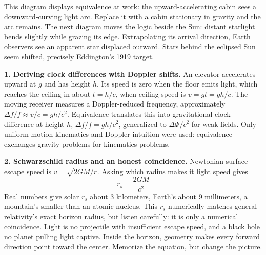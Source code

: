 \begin{mainline}
This diagram displays equivalence at work: the upward-accelerating cabin sees a downward-curving light arc. Replace it with a cabin stationary in gravity and the arc remains. The next diagram moves the logic beside the Sun: distant starlight bends slightly while grazing its edge. Extrapolating its arrival direction, Earth observers see an apparent star displaced outward. Stars behind the eclipsed Sun seem shifted, precisely Eddington's 1919 target.
\end{mainline}

\begin{center}
\end{center}

\begin{mathbridge}
\textbf{1. Deriving clock differences with Doppler shifts.} An elevator accelerates upward at \(g\) and has height \(h\). Its speed is zero when the floor emits light, which reaches the ceiling in about \(t=h/c\), when ceiling speed is \(v=gt=gh/c\). The moving receiver measures a Doppler-reduced frequency, approximately \(\Delta f/f\approx v/c=gh/c^{2}\). Equivalence translates this into gravitational clock difference at height \(h\), \(\Delta f/f=gh/c^{2}\), generalized to \(\Delta\Phi/c^{2}\) for weak fields. Only uniform-motion kinematics and Doppler intuition were used: equivalence exchanges gravity problems for kinematics problems.

\textbf{2. Schwarzschild radius and an honest coincidence.} Newtonian surface escape speed is \(v=\sqrt{2GM/r}\). Asking which radius makes it light speed gives
\[
r_{s}=\frac{2GM}{c^{2}}
\]
Real numbers give solar \(r_{s}\) about 3 kilometers, Earth's about 9 millimeters, a mountain's smaller than an atomic nucleus. This \(r_{s}\) numerically matches general relativity's exact horizon radius, but listen carefully: it is only a numerical coincidence. Light is no projectile with insufficient escape speed, and a black hole no planet pulling light captive. Inside the horizon, geometry makes every forward direction point toward the center. Memorize the equation, but change the picture.
\end{mathbridge}

